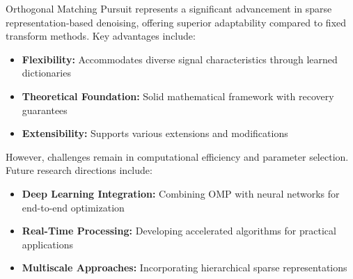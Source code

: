 \documentclass[12pt]{article}
\theoremstyle{definition}
\begin{document}
Orthogonal Matching Pursuit represents a significant advancement in sparse representation-based denoising, offering superior adaptability compared to fixed transform methods. Key advantages include:

\begin{itemize}[leftmargin=*]
    \item \textbf{Flexibility:} Accommodates diverse signal characteristics through learned dictionaries
    \item \textbf{Theoretical Foundation:} Solid mathematical framework with recovery guarantees
    \item \textbf{Extensibility:} Supports various extensions and modifications
\end{itemize}

However, challenges remain in computational efficiency and parameter selection. Future research directions include:

\begin{itemize}[leftmargin=*]
    \item \textbf{Deep Learning Integration:} Combining OMP with neural networks for end-to-end optimization
    \item \textbf{Real-Time Processing:} Developing accelerated algorithms for practical applications
    \item \textbf{Multiscale Approaches:} Incorporating hierarchical sparse representations
\end{itemize}
\end{document}
